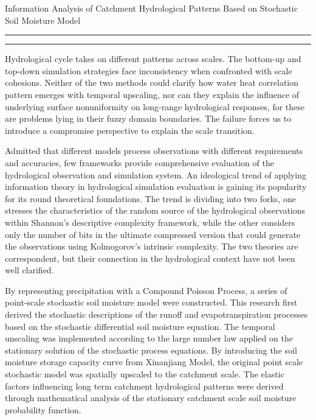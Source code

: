 \documentclass{article}
\newcommand{\soptitle}{Information Analysis of Catchment Hydrological Patterns Based on Stochastic Soil Moisture Model}
\begin{document}
\begin{center}\LARGE\soptitle\\
 
\end{center}

\hrule
\vspace{1pt}
\hrule height 1pt

\bigskip

Hydrological cycle takes on different patterns across scales. %
 The bottom-up and top-down simulation strategies face inconsistency when confronted with scale cohesions. Neither of the two methods could clarify how water heat correlation pattern emerges with temporal upscaling, nor can they explain the influence of underlying surface nonuniformity on long-range hydrological responses, for these are problems lying in their fuzzy domain boundaries. The failure forces us to introduce a compromise perspective to explain the scale transition.    
  
Admitted that different models process observations with different requirements and accuracies, few frameworks provide comprehensive evaluation of the hydrological observation and simulation system. An ideological trend of applying information theory in hydrological simulation evaluation is gaining its popularity for its round theoretical foundations. The trend is dividing into two forks, one stresses the characteristics of the random source of the hydrological observations  within Shannon's descriptive complexity framework, while the other considers only the number of bits in the ultimate compressed version that could generate the observations using Kolmogorov's intrinsic complexity. The two theories are correspondent, but their connection in the hydrological context have not been well clarified.  

By representing precipitation with a Compound Poisson Process, a series of point-scale stochastic soil moisture model were constructed. This research first derived the stochastic  descriptions of the runoff and evapotranspiration 
processes based on the  stochastic differential soil moisture equation. The temporal unscaling was implemented according to the large number law applied on  the stationary solution of the stochastic process equations. By introducing the soil moisture storage capacity curve from Xinanjiang Model, the original point scale stochastic model was spatially upscaled to the catchment scale. The elastic factors influencing long term catchment hydrological patterns were derived through mathematical analysis of the stationary catchment scale soil moisture probability function. 
\end{document}
